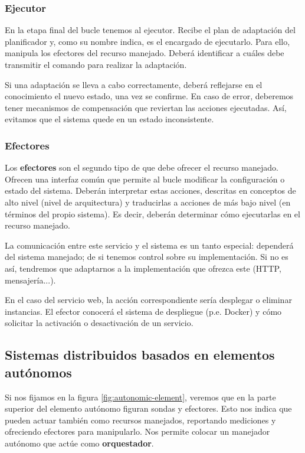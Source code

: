 \subsubsection{Ejecutor}

En la etapa final del bucle tenemos al ejecutor. Recibe el plan de adaptación del planificador y, como su nombre indica, es el encargado de ejecutarlo. Para ello, manipula los efectores del recurso manejado. Deberá identificar a cuáles debe transmitir el comando para realizar la adaptación.

Si una adaptación se lleva a cabo correctamente, deberá reflejarse en el conocimiento el nuevo estado, una vez se confirme. En caso de error, deberemos tener mecanismos de compensación que reviertan las acciones ejecutadas. Así, evitamos que el sistema quede en un estado inconsistente.

\subsubsection{Efectores}

Los \textbf{efectores} son el segundo tipo de  que debe ofrecer el recurso manejado. Ofrecen una interfaz común que permite al bucle modificar la configuración o estado del sistema. Deberán interpretar estas acciones, descritas en conceptos de alto nivel (nivel de arquitectura) y traducirlas a acciones de más bajo nivel (en términos del propio sistema). \cite{garlanIncreasingSystemDependability2003} Es decir, deberán determinar cómo ejecutarlas en el recurso manejado.

La comunicación entre este servicio y el sistema es un tanto especial: dependerá del sistema manejado; de si tenemos control sobre su implementación. Si no es así, tendremos que adaptarnos a la implementación que ofrezca este (HTTP, mensajería...).

En el caso del servicio web, la acción correspondiente sería desplegar o eliminar instancias. El efector conocerá el sistema de despliegue (p.e. Docker) y cómo solicitar la activación o desactivación de un servicio.

\subsection{Sistemas distribuidos basados en elementos autónomos}

Si nos fijamos en la figura \ref{fig:autonomic-element}, veremos que en la parte superior del elemento autónomo figuran sondas y efectores. Esto nos indica que pueden actuar también como recursos manejados, reportando mediciones y ofreciendo efectores para manipularlo. Nos permite colocar un manejador autónomo que actúe como \textbf{orquestador}. \cite{ibmcorporationArchitecturalBlueprintAutonomic2006}

